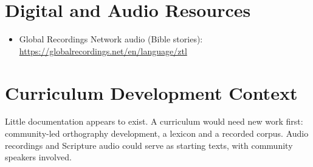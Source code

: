 \documentclass[12pt]{article}
\begin{document}
\section{Digital and Audio Resources}
\begin{itemize}
\item Global Recordings Network audio (Bible stories): \url{https://globalrecordings.net/en/language/ztl}
\end{itemize}

\section{Curriculum Development Context}
Little documentation appears to exist. A curriculum would need new work first: community-led orthography development, a lexicon and a recorded corpus. Audio recordings and Scripture audio could serve as starting texts, with community speakers involved.
\end{document}
